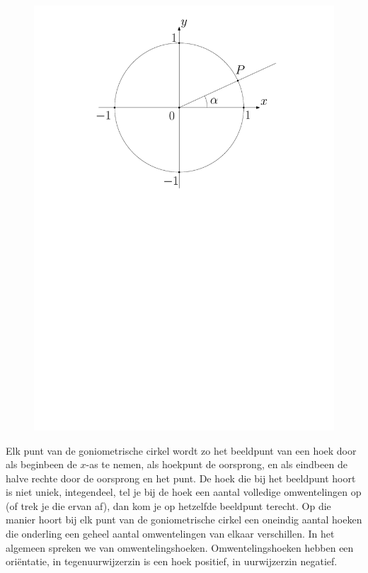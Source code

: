 \begin{figure}[h]
\begin{center}
\includegraphics[scale=0.4]{3_gonio_complexe_getallen/inputs/goncirkelhoek.pdf}
\end{center}
\end{figure}

Elk punt van de goniometrische cirkel wordt zo het beeldpunt van een hoek door als beginbeen de $x$-as te nemen, als hoekpunt de oorsprong, en als eindbeen de halve rechte door de oorsprong en het punt. De hoek die bij het beeldpunt hoort is niet uniek, integendeel, tel je bij de hoek een aantal volledige omwentelingen op (of trek je die ervan af), dan kom je op hetzelfde beeldpunt terecht. Op die manier hoort bij elk punt van de goniometrische cirkel een oneindig aantal hoeken die onderling een geheel aantal omwentelingen van elkaar verschillen.
In het algemeen spreken we van omwentelingshoeken. Omwentelingshoeken hebben een oriëntatie, in tegenuurwijzerzin is een hoek positief, in uurwijzerzin negatief.


